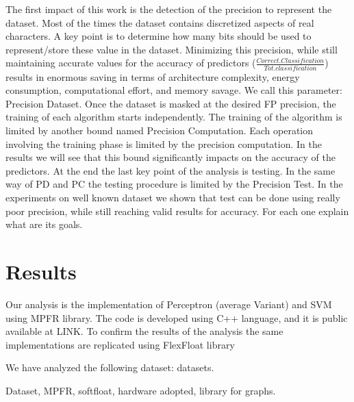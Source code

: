 \documentclass[sigplan,review,anonymous=false]{acmart}\settopmatter{printfolios=true,printccs=false,printacmref=false}
\begin{document}
The first impact of this work is the detection of the precision to represent the dataset. 
Most of the times the dataset contains discretized aspects of real characters. A key point is to determine how many bits should be used to represent/store these value in the dataset. Minimizing this precision, while still maintaining accurate values for the accuracy of predictors ($\frac{Correct.Classification}{Tot.classification}$) results in enormous saving in terms of architecture complexity, energy consumption, computational effort, and memory savage\cite{softfloat}. We call this parameter: Precision Dataset.
Once the dataset is masked at the desired FP precision, the training of each algorithm starts independently. The training of the algorithm is limited by another bound named Precision Computation. Each operation involving the training phase is limited by the precision computation. In the results we will see that this bound significantly impacts on the accuracy of the predictors.
At the end the last key point of the analysis is testing. In the same way of PD and PC the testing procedure is limited by the Precision Test. In the experiments on well known dataset we shown that test can be done using really poor precision, while still reaching valid results for accuracy.
For each one explain what are its goals. 

\newpage
\section{Results}
Our analysis is the implementation of Perceptron (average Variant) and SVM using MPFR\cite{MPFR} library. The code is developed using C++ language, and it is public available at LINK.
To confirm the results of the analysis the same implementations are replicated using FlexFloat library \cite{softfloat}

We have analyzed the following dataset: datasets.

Dataset, MPFR, softfloat, hardware adopted, library for graphs. 
\end{document}
